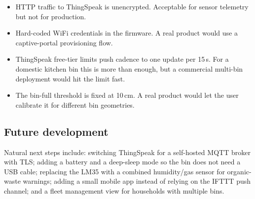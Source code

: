 \documentclass{article}
\begin{document}
\begin{itemize}
    \item HTTP traffic to ThingSpeak is unencrypted. Acceptable for sensor telemetry but not for production.
    \item Hard-coded WiFi credentials in the firmware. A real product would use a captive-portal provisioning flow.
    \item ThingSpeak free-tier limits push cadence to one update per 15\,s. For a domestic kitchen bin this is more than enough, but a commercial multi-bin deployment would hit the limit fast.
    \item The bin-full threshold is fixed at 10\,cm. A real product would let the user calibrate it for different bin geometries.
\end{itemize}

\subsection{Future development}
\label{sec:future}

Natural next steps include: switching ThingSpeak for a self-hosted MQTT broker with TLS; adding a battery and a deep-sleep mode so the bin does not need a USB cable; replacing the LM35 with a combined humidity/gas sensor for organic-waste warnings; adding a small mobile app instead of relying on the IFTTT push channel; and a fleet management view for households with multiple bins.

\ifdefined\mainfile\else
\end{document}
